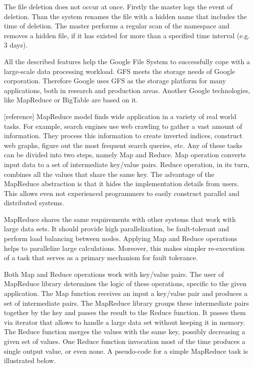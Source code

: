 The file deletion does not occur at once.
Firstly the master logs the event of deletion.
Than the system renames the file with a hidden name that includes the time of deletion.
The master performs a regular scan of the namespace and removes a hidden file, if it has existed for more than a specified time interval (e.g. 3 days). 

All the described features help the Google File System to successfully cope with a large-scale data processing workload.
GFS meets the storage needs of Google corporation.
Therefore Google uses GFS as the storage platform for many applications, both in research and production areas.
Another Google technologies, like MapReduce or BigTable are based on it.  	 

[reference]
MapReduce model finds wide application in a variety of real world tasks.
For example, search engines use web crawling to gather a vast amount of information.
They process this information to create inverted indices, construct web graphs, figure out the most frequent search queries, etc.
Any of these tasks can be divided into two steps, namely Map and Reduce.
Map operation converts input data to a set of intermediate key/value pairs.
Reduce operation, in its turn, combines all the values that share the same key.
The advantage of the MapReduce abstraction is that it hides the implementation details from users.
This allows even not experienced programmers to easily construct parallel and distributed systems.

MapReduce shares the same requirements with other systems that work with large data sets.
It should provide high parallelization, be fault-tolerant and perform load balancing between nodes.
Applying Map and Reduce operations helps to parallelize large calculations.
Moreover, this makes simpler re-execution of a task that serves as a primary mechanism for fault tolerance.

Both Map and Reduce operations work with key/value pairs.
The user of MapReduce library determines the logic of these operations, specific to the given application.
The Map function receives an input a key/value pair and produces a set of intermediate pairs.
The MapReduce library groups these intermediate pairs together by the key and passes the result to the Reduce function.
It passes them via iterator that allows to handle a large data set without keeping it in memory.
The Reduce function merges the values with the same key, possibly decreasing a given set of values.
One Reduce function invocation most of the time produces a single output value, or even none.
A pseudo-code for a simple MapReduce task is illustrated below.


